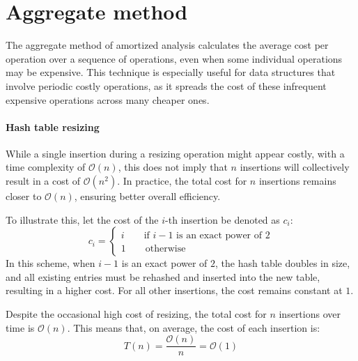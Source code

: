 \section{Aggregate method}

The aggregate method of amortized analysis calculates the average cost per operation over a sequence of operations, even when some individual operations may be expensive. 
This technique is especially useful for data structures that involve periodic costly operations, as it spreads the cost of these infrequent expensive operations across many cheaper ones.

\paragraph*{Hash table resizing}
While a single insertion during a resizing operation might appear costly, with a time complexity of $\mathcal{O}(n)$, this does not imply that $n$ insertions will collectively result in a cost of $\mathcal{O}(n^2)$. 
In practice, the total cost for $n$ insertions remains closer to $\mathcal{O}(n)$, ensuring better overall efficiency.

To illustrate this, let the cost of the $i$-th insertion be denoted as $c_i$:
\[c_i=\begin{cases}
    i \qquad\text{if }i - 1 \text{ is an exact power of }2 \\
    1 \qquad\text{otherwise}
\end{cases}\]
In this scheme, when $i - 1$ is an exact power of $2$, the hash table doubles in size, and all existing entries must be rehashed and inserted into the new table, resulting in a higher cost. 
For all other insertions, the cost remains constant at $1$.

Despite the occasional high cost of resizing, the total cost for $n$ insertions over time is $\mathcal{O}(n)$. 
This means that, on average, the cost of each insertion is: 
\[T(n)=\frac{\mathcal{O}(n)}{n}=\mathcal{O}(1)\]